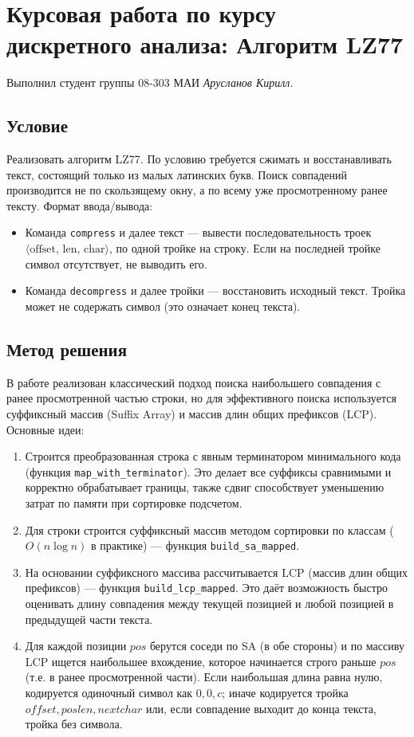 \documentclass[12pt]{article}
\begin{document}
\section*{Курсовая работа по курсу дискретного анализа: Алгоритм LZ77}

Выполнил студент группы 08-303 МАИ \textit{Арусланов Кирилл}.

\subsection*{Условие}

Реализовать алгоритм LZ77. По условию требуется сжимать и восстанавливать текст, состоящий только из малых латинских букв. Поиск совпадений производится не по скользящему окну, а по всему уже просмотренному ранее тексту. Формат ввода/вывода:
\begin{itemize}
  \item Команда \texttt{compress} и далее текст --- вывести последовательность троек $\langle\text{offset},\,\text{len},\,\text{char}\rangle$, по одной тройке на строку. Если на последней тройке символ отсутствует, не выводить его.
  \item Команда \texttt{decompress} и далее тройки --- восстановить исходный текст. Тройка может не содержать символ (это означает конец текста).
\end{itemize}

\subsection*{Метод решения}

В работе реализован классический подход поиска наибольшего совпадения с ранее просмотренной частью строки, но для эффективного поиска используется суффиксный массив (Suffix Array) и массив длин общих префиксов (LCP). Основные идеи:
\begin{enumerate}
  \item Строится преобразованная строка с явным терминатором минимального кода (функция \texttt{map\_with\_terminator}). Это делает все суффиксы сравнимыми и корректно обрабатывает границы, также сдвиг способствует уменьшению затрат по памяти при сортировке подсчетом.
  \item Для строки строится суффиксный массив методом сортировки по классам ($O(n\log n)$ в практике) --- функция \texttt{build\_sa\_mapped}.
  \item На основании суффиксного массива рассчитывается LCP (массив длин общих префиксов) --- функция \texttt{build\_lcp\_mapped}. Это даёт возможность быстро оценивать длину совпадения между текущей позицией и любой позицией в предыдущей части текста.
  \item Для каждой позиции $pos$ берутся соседи по SA (в обе стороны) и по массиву LCP ищется наибольшее вхождение, которое начинается строго раньше $pos$ (т.е. в ранее просмотренной части). Если наибольшая длина равна нулю, кодируется одиночный символ как $0,0,c$; иначе кодируется тройка $offset,poslen,nextchar$ или, если совпадение выходит до конца текста, тройка без символа.
\end{enumerate}
\end{document}
